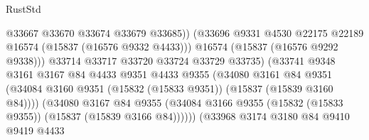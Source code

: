 \begin{lexlean}{RustStd}
\begin{coremodule}
                                            @33667
                                            @33670
                                            @33674
                                            @33679
                                            @33685))
                                        (@33696
                                          @9331
                                          @4530
                                          @22175
                                          @22189
                                          @16574
                                          (@15837 (@16576 @9332 @4433)))
                                        @16574
                                        (@15837 (@16576 @9292 @9338)))
                                      @33714
                                      @33717
                                      @33720
                                      @33724
                                      @33729
                                      @33735)
                                    (@33741
                                      @9348
                                      @3161
                                      @3167
                                      @84
                                      @4433
                                      @9351
                                      @4433
                                      @9355
                                      (@34080
                                        @3161
                                        @84
                                        @9351
                                        (@34084
                                          @3160
                                          @9351
                                          (@15832 (@15833 @9351))
                                          (@15837 (@15839 @3160 @84))))
                                      (@34080
                                        @3167
                                        @84
                                        @9355
                                        (@34084
                                          @3166
                                          @9355
                                          (@15832 (@15833 @9355))
                                          (@15837 (@15839 @3166 @84))))))
                                  (@33968
                                    @3174
                                    @3180
                                    @84
                                    @9410
                                    @9419
                                    @4433

\end{coremodule}
\end{lexlean}
